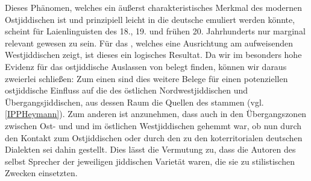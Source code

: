Dieses Phänomen, welches ein äußerst charakteristisches Merkmal des modernen Ostjiddischen ist und  prinzipiell leicht in die deutsche  emuliert werden könnte, scheint für Laienlinguisten des 18., 19. und frühen 20. Jahrhunderts nur marginal relevant gewesen zu sein. Für das , welches eine Ausrichtung am \hai{{\IPP}} aufweisenden Westjiddischen zeigt, ist dieses ein logisches Resultat. 
Da wir im  besonders hohe Evidenz für das ostjiddische Auslassen von \hai{{\IPP}} belegt finden, können wir daraus zweierlei schließen: Zum einen sind dies weitere Belege für einen potenziellen ostjiddische Einfluss auf die  des östlichen Nordwestjiddischen und Übergangsjiddischen, aus dessen Raum die Quellen des  stammen (vgl.\, \ref{IPPHeymann}). Zum anderen ist anzunehmen, dass \hai{{\IPP}} auch in den Übergangszonen zwischen Ost- und  und im östlichen Westjiddischen gehemmt war, ob nun durch den Kontakt zum Ostjiddischen oder durch den zu den koterritorialen deutschen Dialekten sei dahin gestellt. Dies lässt die Vermutung zu, dass die Autoren des  selbst Sprecher der jeweiligen jiddischen Varietät waren, die sie zu stilistischen Zwecken einsetzten. 

    
    
